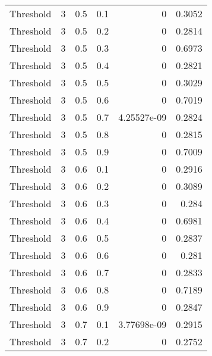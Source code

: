 \documentclass{article}
\begin{document}
\begin{longtable}[H]{lrrrrr}
 Threshold      &       3 &   0.5 &            0.1 &      0           &          0.3052 \\
 Threshold      &       3 &   0.5 &            0.2 &      0           &          0.2814 \\
 Threshold      &       3 &   0.5 &            0.3 &      0           &          0.6973 \\
 Threshold      &       3 &   0.5 &            0.4 &      0           &          0.2821 \\
 Threshold      &       3 &   0.5 &            0.5 &      0           &          0.3029 \\
 Threshold      &       3 &   0.5 &            0.6 &      0           &          0.7019 \\
 Threshold      &       3 &   0.5 &            0.7 &      4.25527e-09 &          0.2824 \\
 Threshold      &       3 &   0.5 &            0.8 &      0           &          0.2815 \\
 Threshold      &       3 &   0.5 &            0.9 &      0           &          0.7009 \\
 Threshold      &       3 &   0.6 &            0.1 &      0           &          0.2916 \\
 Threshold      &       3 &   0.6 &            0.2 &      0           &          0.3089 \\
 Threshold      &       3 &   0.6 &            0.3 &      0           &          0.284  \\
 Threshold      &       3 &   0.6 &            0.4 &      0           &          0.6981 \\
 Threshold      &       3 &   0.6 &            0.5 &      0           &          0.2837 \\
 Threshold      &       3 &   0.6 &            0.6 &      0           &          0.281  \\
 Threshold      &       3 &   0.6 &            0.7 &      0           &          0.2833 \\
 Threshold      &       3 &   0.6 &            0.8 &      0           &          0.7189 \\
 Threshold      &       3 &   0.6 &            0.9 &      0           &          0.2847 \\
 Threshold      &       3 &   0.7 &            0.1 &      3.77698e-09 &          0.2915 \\
 Threshold      &       3 &   0.7 &            0.2 &      0           &          0.2752 \\

\end{longtable}
\end{document}
